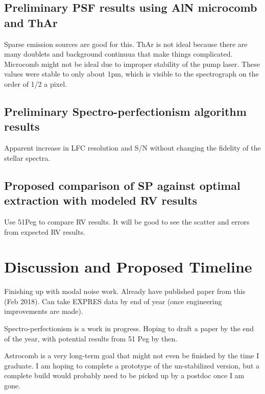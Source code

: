 \documentclass[11pt]{article}
\begin{document}
\subsection{Preliminary PSF results using AlN microcomb and ThAr}

Sparse emission sources are good for this. ThAr is not ideal because there are many doublets and background continuua that make things complicated. Microcomb might not be ideal due to improper stability of the pump laser. These values were stable to only about 1pm, which is visible to the spectrograph on the order of 1/2 a pixel.

\subsection{Preliminary Spectro-perfectionism algorithm results}

Apparent increase in LFC resolution and S/N without changing the fidelity of the stellar spectra.

\subsection{Proposed comparison of SP against optimal extraction with modeled RV results}

Use 51Peg to compare RV results. It will be good to see the scatter and errors from expected RV results.

\section{Discussion and Proposed Timeline}

Finishing up with modal noise work. Already have published paper from this (Feb 2018). Can take EXPRES data by end of year (once engineering improvements are made).

Spectro-perfectionism is a work in progress. Hoping to draft a paper by the end of the year, with potential results from 51 Peg by then.

Astrocomb is a very long-term goal that might not even be finished by the time I graduate. I am hoping to complete a prototype of the un-stabilized version, but a complete build would probably need to be picked up by a postdoc once I am gone.



\pagebreak



\end{document}
